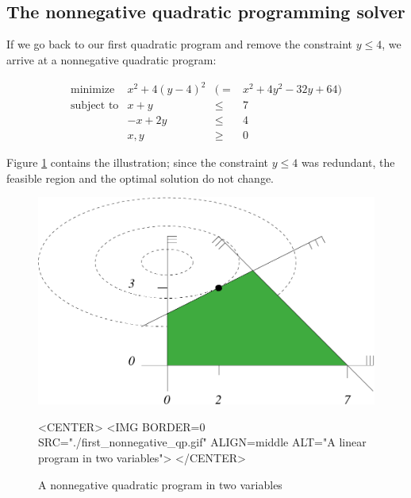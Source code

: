 \\
\\

\subsection{The  nonnegative quadratic programming solver}
If we go back to our first quadratic program and
remove the constraint $y\leq 4$, we arrive at a nonnegative quadratic
program: 

\[
\begin{array}{lrcl}
\mbox{minimize}       & x^2 + 4(y-4)^2 &(=& x^2 + 4y^2 - 32y + 64) \\
\mbox{subject to}     & x + y &\leq& 7 \\
                      & -x + 2y &\leq& 4 \\
                      & x,y &\geq& 0
\end{array}
\]

Figure \ref{fig:QP-first_nonnegative_qp} contains 
the illustration; since the constraint $y\leq 4$ was 
redundant, the feasible region and the optimal solution do 
not change. 

\begin{figure}[htbp]
\begin{ccTexOnly}
\begin{center}
\includegraphics{QP_solver/first_nonnegative_qp} 
\end{center}
\end{ccTexOnly}

\begin{ccHtmlOnly}
<CENTER>
<IMG BORDER=0 SRC="./first_nonnegative_qp.gif" ALIGN=middle ALT="A linear program in two variables">
</CENTER>
\end{ccHtmlOnly}

\caption{A nonnegative quadratic program in two variables
\label{fig:QP-first_nonnegative_qp}}
\end{figure}


